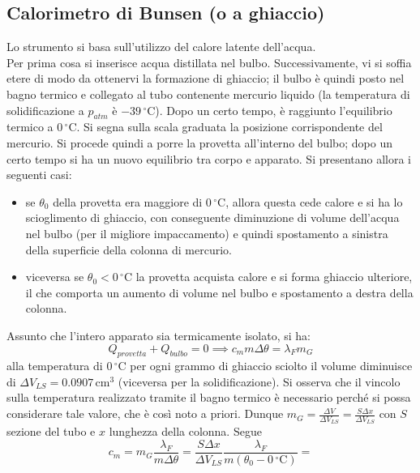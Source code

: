 \documentclass[10pt, oneside]{book}
\newcommand{\celsius}{\, \mathrm{{}^\circ C}}
\newcommand{\meters}[2]{\, \mathrm{#1 m^{#2}}}
\newcommand{\ds}{\displaystyle}
\begin{document}
\subsection{Calorimetro di Bunsen (o a ghiaccio)}
Lo strumento si basa sull'utilizzo del calore latente dell'acqua.\\
Per prima cosa si inserisce acqua distillata nel bulbo. Successivamente, vi si soffia etere di modo da ottenervi la formazione di ghiaccio; il bulbo è quindi posto nel bagno termico e collegato al tubo contenente mercurio liquido (la temperatura di solidificazione a $p_{atm}$ è $-39 \celsius$). Dopo un certo tempo, è raggiunto l'equilibrio termico a $0 \celsius$. Si segna sulla scala graduata la posizione corrispondente del mercurio. Si procede quindi a porre la provetta all'interno del bulbo; dopo un certo tempo si ha un nuovo equilibrio tra corpo e apparato. Si presentano allora i seguenti casi:
\begin{itemize}
\item se $\theta_0$ della provetta era maggiore di $0 \celsius$, allora questa cede calore e si ha lo scioglimento di ghiaccio, con conseguente diminuzione di volume dell'acqua nel bulbo (per il migliore impaccamento) e quindi spostamento a sinistra della superficie della colonna di mercurio.
\item viceversa se $\theta_0 < 0 \celsius$ la provetta acquista calore e si forma ghiaccio ulteriore, il che comporta un aumento di volume nel bulbo e spostamento a destra della colonna.
\end{itemize}
Assunto che l'intero apparato sia termicamente isolato, si ha:
\[Q_{provetta} + Q_{bulbo} = 0 \implies c_m m \Delta \theta = \lambda_F m_G\]
alla temperatura di $0 \celsius$ per ogni grammo di ghiaccio sciolto il volume diminuisce di $\Delta V_{LS} = 0.0907 \meters{c}{3}$ (viceversa per la solidificazione). Si osserva che il vincolo sulla temperatura realizzato tramite il bagno termico è necessario perché si possa considerare tale valore, che è così noto a priori. Dunque $\ds m_G = \frac{\Delta V}{\Delta V_{LS}} = \frac{S \Delta x}{\Delta V_{LS}}$ con $S$ sezione del tubo e $x$ lunghezza della colonna. Segue
\[c_m = m_G \frac{\lambda_F}{m \Delta \theta} = \frac{S \Delta x}{\Delta V_{LS}} \frac{\lambda_F}{m (\theta_0 - 0 \celsius)} = \]
\end{document}
